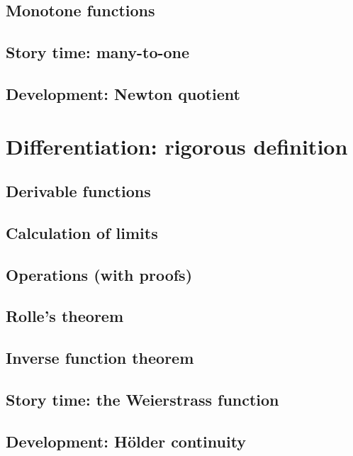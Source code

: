 \documentclass[
	fontsize=10pt, %
	twoside=true, %
	secnumdepth=1, %
	numbers=noenddot, %
]{kaobook}
\begin{document}
\section{Monotone functions}

\section{Story time: many-to-one}

\section{Development: Newton quotient}

\chapter{Differentiation: rigorous definition}

\blindtext

\section{Derivable functions}

\section{Calculation of limits}

\section{Operations (with proofs)}

\section{Rolle's theorem}

\section{Inverse function theorem}

\section{Story time: the Weierstrass function}

\section{Development: Hölder continuity}
\end{document}
